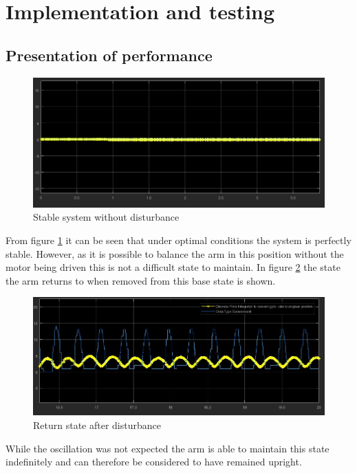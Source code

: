 \documentclass[11pt, a4paper,twocolumn]{article}
\begin{document}
    \section{Implementation and testing}\label{sec:test}
        \subsection{Presentation of performance}\label{subsec:performance}

	\begin{figure}[h!]
	\begin{center}
	\includegraphics[width=\linewidth]{Undisturbed}
	\caption{Stable system without disturbance}
	\label{fig:4.1}
	\end{center}
	\end{figure}
From figure \ref{fig:4.1} it can be seen that under optimal conditions the system is perfectly stable. However, as it is possible to balance the arm in this position without the motor being driven this is not a difficult state to maintain. In figure \ref{fig:4.2} the state the arm returns to when removed from this base state is shown.
	\begin{figure}[h!]
	\begin{center}
	\includegraphics[width=\linewidth]{Ocilation}
	\caption{Return state after disturbance}
	\label{fig:4.2}
	\end{center}
	\end{figure}
While the oscillation was not expected the arm is able to maintain this state indefinitely and can therefore be considered to have remained upright.
\end{document}
